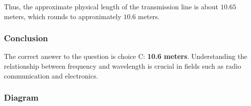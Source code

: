 Thus, the approximate physical length of the transmission line is about \(10.65\) meters, which rounds to approximately \(10.6\) meters.

\subsubsection{Conclusion}

The correct answer to the question is choice C: \textbf{10.6 meters}. Understanding the relationship between frequency and wavelength is crucial in fields such as radio communication and electronics.

\subsubsection{Diagram}

\begin{center}
\end{center}
